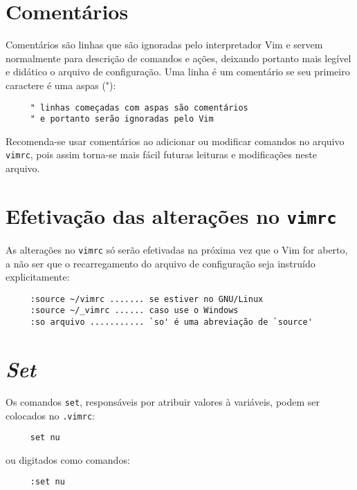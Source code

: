 \section{Comentários }
\label{Comentários }

Comentários são linhas que são ignoradas pelo interpretador Vim e servem
normalmente para descrição de comandos e ações, deixando portanto mais legível
e didático o arquivo de configuração. Uma linha é um comentário se seu
primeiro caractere é uma aspas ("):

\begin{verbatim}
     " linhas começadas com aspas são comentários
     " e portanto serão ignoradas pelo Vim
\end{verbatim}

Recomenda-se usar comentários ao adicionar ou modificar comandos no arquivo
{\tt vimrc}, pois assim torna-se mais fácil futuras leituras e modificações
neste arquivo.

\section{Efetivação das alterações no {\tt vimrc}}
\label{Efetivação das alterações no vimrc}

As alterações no {\tt vimrc} só serão efetivadas na próxima vez que o Vim for
aberto, a não ser que o recarregamento do arquivo de configuração seja
instruído explicitamente:

\begin{verbatim}
     :source ~/vimrc ....... se estiver no GNU/Linux
     :source ~/_vimrc ...... caso use o Windows
     :so arquivo ........... `so' é uma abreviação de `source'
\end{verbatim}

\section{{\em Set}}
\label{Set}

Os comandos {\tt set}, responsáveis por atribuir valores à variáveis,
 podem ser colocados no \verb|.vimrc|:

\begin{verbatim}
     set nu
\end{verbatim}

ou digitados como comandos:

\begin{verbatim}
     :set nu
\end{verbatim}

